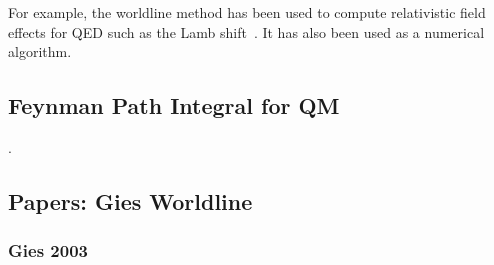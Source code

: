 For example, the worldline method has been used to compute relativistic field effects for QED such
 as the Lamb shift~\cite{Schmidt1995}.  It has also been used as a numerical algorithm\cite{Mazur2014}.

\subsection{Feynman Path Integral for QM}

\cite{Feynman1948,Feynman1965,Brown2005}.

\subsection{Papers: Gies Worldline}

\subsubsection{Gies 2003}
\cite{Gies2003}

